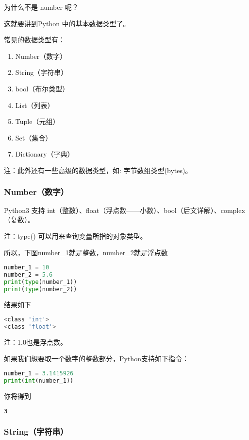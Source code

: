 为什么不是 number 呢？

这就要讲到Python 中的基本数据类型了。

常见的数据类型有：

\begin{enumerate}
\item Number（数字）
\item String（字符串）
\item bool（布尔类型）
\item List（列表）
\item Tuple（元组）
\item Set（集合）
\item Dictionary（字典）
\end{enumerate}

注：此外还有一些高级的数据类型，如: 字节数组类型(bytes)。

\subsubsection{Number（数字）}

Python3 支持 int（整数）、float（浮点数——小数）、bool（后文详解）、complex（复数）。

注：type() 可以用来查询变量所指的对象类型。

所以，下图number_1就是整数，number_2就是浮点数

\begin{lstlisting}[language=python]
number_1 = 10 
number_2 = 5.6
print(type(number_1))
print(type(number_2))
\end{lstlisting}

结果如下

\begin{lstlisting}[language=bash]
<class 'int'>
<class 'float'>
\end{lstlisting}

注：1.0也是浮点数。

如果我们想要取一个数字的整数部分，Python支持如下指令：

\begin{lstlisting}[language=python]
number_1 = 3.1415926
print(int(number_1))
\end{lstlisting}

你将得到

\begin{lstlisting}[language=bash]
3
\end{lstlisting}

\subsubsection{String（字符串）}

